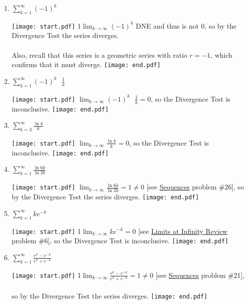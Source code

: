 \documentclass[12pt]{article}
\begin{document}
\begin{enumerate}

\item $\sum_{k=1}^{\infty}(-1)^k$

\texttt{[image: start.pdf]}
{{{1\linewidth}{$\lim_{k \rightarrow \infty}(-1)^k$ DNE and thus is not 0, so by the Divergence Test the series diverges. \\ \\  Also, recall that this series is a geometric series with ratio $r=-1$, which  \\ confirms that it must diverge. }}}
\texttt{[image: end.pdf]}


\item $\sum_{k=1}^{\infty}(-1)^k \text{ } \frac{1}{k}$

\texttt{[image: start.pdf]}
{{$\lim_{k \rightarrow \infty}(-1)^k \text{ } \frac{1}{k}=0$, so the Divergence Test is inconclusive. }}
\texttt{[image: end.pdf]}


\item $\sum_{k=3}^{\infty}\frac{\ln{k}}{k}$

\texttt{[image: start.pdf]}
{{$\lim_{k \rightarrow \infty}\frac{\ln{k}}{k}=0$, so the Divergence Test is inconclusive. }}
\texttt{[image: end.pdf]}


\item $\sum_{k=1}^{\infty}\frac{\ln{6k}}{\ln{2k}}$

\texttt{[image: start.pdf]}
{{$\lim_{k \rightarrow \infty}\frac{\ln{6k}}{\ln{2k}}=1\neq0$ [see \underline{Sequences} problem \#26], so by the Divergence Test the series diverges.}}
\texttt{[image: end.pdf]}


\item $\sum_{k=1}^{\infty}{ke^{-k}}$

\texttt{[image: start.pdf]}
{{{1\linewidth}{$\lim_{k \rightarrow \infty}{ke^{-k}}=0$ [see \underline{Limits at Infinity Review} problem \#6], so the Divergence Test is inconclusive.}}}
\texttt{[image: end.pdf]}


\item $\sum_{k=1}^{\infty}\frac{e^k-e^{-k}}{e^k+e^{-k}}$

\texttt{[image: start.pdf]}
{{{1\linewidth}{$\lim_{k \rightarrow \infty}\frac{e^k-e^{-k}}{e^k+e^{-k}}=1\neq0$ [see \underline{Sequences} problem \#21], \\ \\ so by the Divergence Test the series diverges.}}}
\texttt{[image: end.pdf]}



\end{enumerate}
\end{document}
